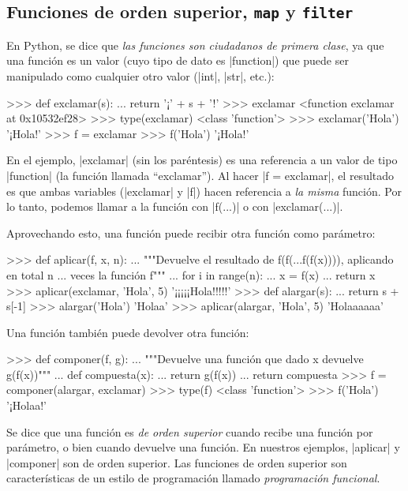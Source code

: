 \newpage
\begin{subappendices}
\section{Funciones de orden superior, \texttt{map} y \texttt{filter}}
\label{map-filter}

En Python, se dice que \emph{las funciones son ciudadanos de primera clase}, ya
que una función es un valor (cuyo tipo de dato es |function|) que puede ser
manipulado como cualquier otro valor (|int|, |str|, etc.):

\begin{codigo-python-sn}
>>> def exclamar(s):
...     return '¡' + s + '!'
>>> exclamar
<function exclamar at 0x10532ef28>
>>> type(exclamar)
<class 'function'>
>>> exclamar('Hola')
'¡Hola!'
>>> f = exclamar
>>> f('Hola')
'¡Hola!'
\end{codigo-python-sn}

En el ejemplo, |exclamar| (sin los paréntesis) es una referencia a un valor de
tipo |function| (la función llamada ``exclamar''). Al hacer |f = exclamar|,
el resultado es que ambas variables (|exclamar| y |f|) hacen referencia a
\emph{la misma} función. Por lo tanto, podemos llamar a la función con
|f(...)| o con |exclamar(...)|.

Aprovechando esto, una función puede recibir otra función como parámetro:

\begin{codigo-python-sn}
>>> def aplicar(f, x, n):
...     """Devuelve el resultado de f(f(...f(f(x)))), aplicando en total n
...        veces la función f"""
...     for i in range(n):
...         x = f(x)
...     return x
>>> aplicar(exclamar, 'Hola', 5)
'¡¡¡¡¡Hola!!!!!'
>>> def alargar(s):
...     return s + s[-1]
>>> alargar('Hola')
'Holaa'
>>> aplicar(alargar, 'Hola', 5)
'Holaaaaaa'
\end{codigo-python-sn}

Una función también puede devolver otra función:

\begin{codigo-python-sn}
>>> def componer(f, g):
...     """Devuelve una función que dado x devuelve g(f(x))"""
...     def compuesta(x):
...         return g(f(x))
...     return compuesta
>>> f = componer(alargar, exclamar)
>>> type(f)
<class 'function'>
>>> f('Hola')
'¡Holaa!'
\end{codigo-python-sn}

Se dice que una función es \emph{de orden superior} cuando recibe una función
por parámetro, o bien cuando devuelve una función. En nuestros ejemplos, |aplicar| y
|componer| son de orden superior. Las funciones de orden superior son
características de un estilo de programación llamado \emph{programación
funcional}.


\end{subappendices}
